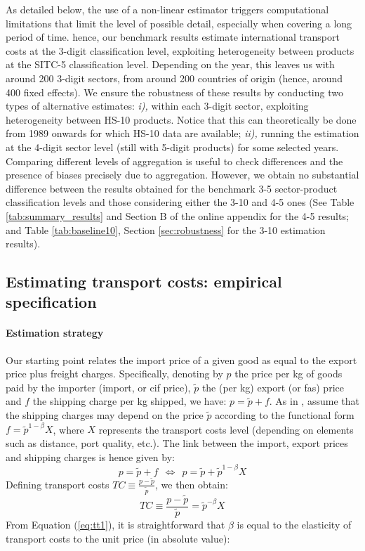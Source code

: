 \documentclass[a4paper,11pt]{article}
\begin{document}
As detailed below, the use of a non-linear estimator triggers computational limitations that limit the level of possible detail, especially when covering a long period of time. hence, our benchmark results estimate international transport costs at the 3-digit classification level, exploiting heterogeneity between products at the SITC-5 classification level. Depending on the year, this leaves us with around 200 3-digit sectors, from around 200 countries of origin (hence, around 400 fixed effects). We ensure the robustness of these results by conducting two types of alternative estimates: \textit{i),} within each 3-digit sector, exploiting heterogeneity between HS-10 products. Notice that this can theoretically be done from 1989 onwards for which HS-10 data are available; \textit{ii),} running the estimation at the 4-digit sector level (still with 5-digit products) for some selected years. Comparing different levels of aggregation is useful to check differences and the presence of biases precisely due to aggregation. However, we obtain no substantial difference between the results obtained for the benchmark 3-5 sector-product classification levels and those considering either the 3-10 and 4-5 ones (See Table \ref{tab:summary_results} and Section B of the online appendix for the 4-5 results; and Table \ref{tab:baseline10}, Section \ref{sec:robustness} for the 3-10 estimation results).



\subsection{Estimating transport costs: empirical specification \label{sec:estimation_strat}}

\paragraph{Estimation strategy} Our starting point relates the import price of a given good as equal to the export price plus freight charges. Specifically, denoting by $p$ the price per kg of goods paid by the importer (import, or cif price), $\widetilde{p}$ the (per kg) export (or fas) price and $f$ the shipping charge per kg shipped, we have: $ p = \widetilde{p} +f$. As in \cite{hummels2010}, assume that the shipping charges may depend on the price $\widetilde{p}$ according to the functional form $f = \widetilde{p}^{1-\beta} X$, where $X$ represents the transport costs level (depending on elements such as distance, port quality, etc.). The link between the import, export prices and shipping charges is hence given by:
$$ p = \widetilde{p}+f ~~ \Leftrightarrow  ~~ p = \widetilde{p}+\widetilde{p}^{1-\beta} X $$
Defining transport costs $TC \equiv \frac{p-\widetilde{p}}{\widetilde{p}}$, we then obtain:
\begin{equation}
TC \equiv \frac{p-\widetilde{p}}{\widetilde{p}} = \widetilde{p}^{-\beta} X \label{eq:tt1}
\end{equation}
From Equation (\ref{eq:tt1}), it is straightforward that $\beta$ is equal to the elasticity of transport costs to the unit price (in absolute value):
\end{document}
